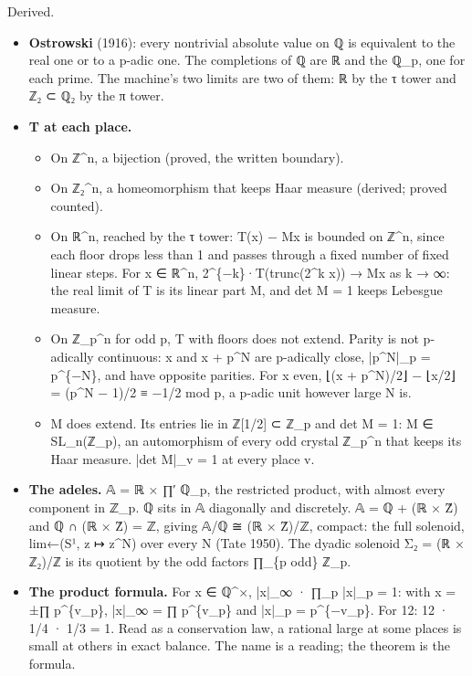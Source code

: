 Derived.

\begin{itemize}
\item \textbf{Ostrowski} (1916): every nontrivial absolute value on ℚ is equivalent to the real one or to a p-adic one. The completions of ℚ are ℝ and the ℚ\_\allowbreak{}p, one for each prime. The machine's two limits are two of them: ℝ by the τ tower and ℤ₂ ⊂ ℚ₂ by the π tower.
\item \textbf{T at each place.}

\begin{itemize}
\item On ℤ\textasciicircum{}n, a bijection (proved, the written boundary).
\item On ℤ₂\textasciicircum{}n, a homeomorphism that keeps Haar measure (derived; proved counted).
\item On ℝ\textasciicircum{}n, reached by the τ tower: T(x) − Mx is bounded on ℤ\textasciicircum{}n, since each floor drops less than 1 and passes through a fixed number of fixed linear steps. For x ∈ ℝ\textasciicircum{}n, 2\textasciicircum{}\{−k\}·T(trunc(2\textasciicircum{}k x)) → Mx as k → ∞: the real limit of T is its linear part M, and det M = 1 keeps Lebesgue measure.
\item On ℤ\_\allowbreak{}p\textasciicircum{}n for odd p, T with floors does not extend. Parity is not p-adically continuous: x and x + p\textasciicircum{}N are p-adically close, |p\textasciicircum{}N|\_\allowbreak{}p = p\textasciicircum{}\{−N\}, and have opposite parities. For x even, ⌊(x + p\textasciicircum{}N)/2⌋ − ⌊x/2⌋ = (p\textasciicircum{}N − 1)/2 ≡ −1/2 mod p, a p-adic unit however large N is.
\item M does extend. Its entries lie in ℤ[1/2] ⊂ ℤ\_\allowbreak{}p and det M = 1: M ∈ SL\_\allowbreak{}n(ℤ\_\allowbreak{}p), an automorphism of every odd crystal ℤ\_\allowbreak{}p\textasciicircum{}n that keeps its Haar measure. |det M|\_\allowbreak{}v = 1 at every place v.
\end{itemize}
\item \textbf{The adeles.} 𝔸 = ℝ × ∏′ ℚ\_\allowbreak{}p, the restricted product, with almost every component in ℤ\_\allowbreak{}p. ℚ sits in 𝔸 diagonally and discretely. 𝔸 = ℚ + (ℝ × Ẑ) and ℚ ∩ (ℝ × Ẑ) = ℤ, giving 𝔸/ℚ ≅ (ℝ × Ẑ)/ℤ, compact: the full solenoid, lim←(S¹, z ↦ z\textasciicircum{}N) over every N (Tate 1950). The dyadic solenoid Σ₂ = (ℝ × ℤ₂)/ℤ is its quotient by the odd factors ∏\_\allowbreak{}\{p odd\} ℤ\_\allowbreak{}p.
\item \textbf{The product formula.} For x ∈ ℚ\textasciicircum{}×, |x|\_\allowbreak{}∞ · ∏\_\allowbreak{}p |x|\_\allowbreak{}p = 1: with x = ±∏ p\textasciicircum{}\{v\_\allowbreak{}p\}, |x|\_\allowbreak{}∞ = ∏ p\textasciicircum{}\{v\_\allowbreak{}p\} and |x|\_\allowbreak{}p = p\textasciicircum{}\{−v\_\allowbreak{}p\}. For 12: 12 · 1/4 · 1/3 = 1. Read as a conservation law, a rational large at some places is small at others in exact balance. The name is a reading; the theorem is the formula.
\end{itemize}


